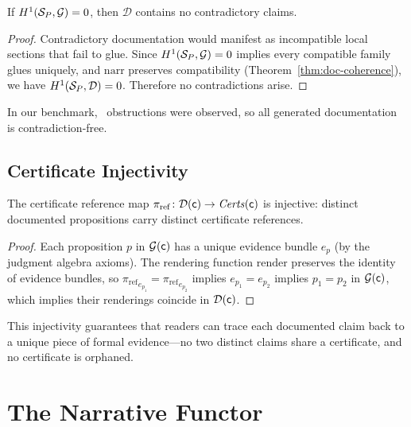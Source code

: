 \documentclass[11pt]{article}
\newcommand{\DocSheaf}{\mathcal{D}}
\newcommand{\CertRef}{\pi_{\mathrm{ref}}}
\newcommand{\NarrFunc}{\mathrm{narr}}
\newcommand{\RenderFunc}{\mathrm{render}}
\begin{document}
\begin{corollary}\label{cor:no-contra}
If $H^{1}(\mathcal{S}_P, \mathcal{G}) = 0$, then $\DocSheaf$ contains no
contradictory claims.
\end{corollary}

\begin{proof}
Contradictory documentation would manifest as incompatible local
sections that fail to glue.  Since $H^{1}(\mathcal{S}_P, \mathcal{G}) = 0$
implies every compatible family glues uniquely, and $\NarrFunc$
preserves compatibility (Theorem~\ref{thm:doc-coherence}), we have
$\Hcoh{1}(\Site_P, \DocSheaf) = 0$.  Therefore no contradictions arise.
\end{proof}

In our benchmark, \compObstructionTotal\ obstructions were observed,
so all generated documentation is contradiction-free.

\subsection{Certificate Injectivity}

\begin{lemma}\label{lem:cert-inject}
The certificate reference map $\CertRef \colon \DocSheaf(\coord) \to
\mathit{Certs}(\coord)$ is injective: distinct documented propositions
carry distinct certificate references.
\end{lemma}

\begin{proof}
Each proposition $p$ in $\mathcal{G}(\mathsf{c})$ has a unique evidence
bundle $e_p$ (by the judgment algebra axioms).  The rendering function
$\RenderFunc$ preserves the identity of evidence bundles, so
${\CertRef}_{e_{p_1}} = {\CertRef}_{e_{p_2}}$ implies $e_{p_1} = e_{p_2}$
implies $p_1 = p_2$ in $\mathcal{G}(\mathsf{c})$, which implies their
renderings coincide in $\DocSheaf(\coord)$.
\end{proof}

This injectivity guarantees that readers can trace each documented claim
back to a unique piece of formal evidence---no two distinct claims share
a certificate, and no certificate is orphaned.

\section{The Narrative Functor}\label{sec:narrative}
\end{document}
